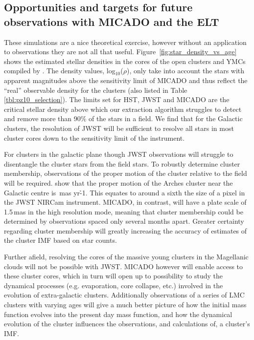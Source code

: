 \subsection{Opportunities and targets for future observations with MICADO and the ELT}

These simulations are a nice theoretical exercise, however without an application to observations they are not all that useful.
Figure~\ref{fig:star_density_vs_age} shows the estimated stellar densities in the cores of the open clusters and YMCs compiled by \citet{portegies2010}. 
The density values, log$_{10}$($\rho$), only take into account the stars with apparent magnitudes above the sensitivity limit of MICADO and thus reflect the ``real'' observable density for the clusters (also listed in Table \ref{tbl:pz10_selection}). 
The limits set for HST, JWST and MICADO are the critical stellar density above which our extraction algorithm struggles to detect and remove more than 90\% of the stars in a field. 
We find that for the Galactic clusters, the resolution of JWST will be sufficient to resolve all stars in most cluster cores down to the sensitivity limit of the instrument.

For clusters in the galactic plane though JWST observations will struggle to disentangle the cluster stars from the field stars. 
To robustly determine cluster membership, observations of the proper motion of the cluster relative to the field will be required. 
\citet{stolte2008} show that the proper motion of the Arches cluster near the Galactic centre is \,mas yr\h{-1}. 
This equates to around a sixth the size of a pixel in the JWST NIRCam instrument. 
MICADO, in contrast, will have a plate scale of 1.5\,mas in the high resolution mode, meaning that cluster membership could be determined by observations spaced only several months apart. Greater certainty regarding cluster membership will greatly increasing the accuracy of estimates of the cluster IMF based on star counts.

Further afield, resolving the cores of the massive young clusters in the Magellanic clouds will not be possible with JWST. MICADO however will enable access to these cluster cores, which in turn will open up to possibility to study the dynamical processes (e.g. evaporation, core collapse, etc.) involved in the evolution of extra-galactic clusters. 
Additionally observations of a series of LMC clusters with varying ages will give a much better picture of how the initial mass function evolves into the present day mass function, and how the dynamical evolution of the cluster influences the observations, and calculations of, a cluster's IMF.


